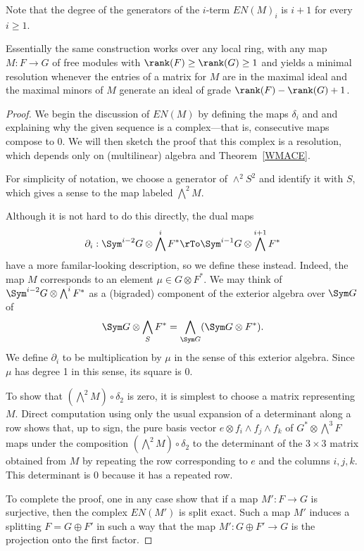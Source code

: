 Note that the degree of the generators of the $i$-term $EN(M)_i$ is $i+1$ for every $i\geq 1$.

Essentially the same construction works over any local ring, with any map $M: F\to G$ of free modules
with $\rank(F) \geq \rank(G) \geq 1$
and yields a minimal resolution whenever the entries of a matrix for $M$ are in the maximal
ideal and the maximal minors of $M$ generate an ideal of grade $\rank(F) - \rank(G)+1$.

\begin{proof} We begin the discussion of $EN(M)$ by defining the maps $\delta_i$ and and explaining why the given sequence is  a complex---that is, consecutive maps compose to 0. We will then sketch the proof that this complex is a resolution,
which depends only on (multilinear) algebra and Theorem~\ref{WMACE}. 

For simplicity of notation, we choose a generator of $\wedge^2 S^2$
 and identify it with $S$, which gives a sense to the map labeled $\bigwedge^2M$.
 
  Although it is not hard to do this directly, the dual maps
 $$
 \partial_i: \Sym^{i-2} G \otimes \bigwedge^i F^* \rTo \Sym^{i-1} G \otimes \bigwedge^{i+1} F^*
 $$
 have a more familar-looking description, so we define these instead. Indeed, the map $M$ corresponds to an
 element $\mu\in G\otimes F^*$. We may think of $ \Sym^{i-2} G \otimes \bigwedge^i  F^*$
 as a (bigraded) component of the exterior algebra over $ \Sym G$ of 
 $$
  \Sym G \otimes \bigwedge_S  F^*= \bigwedge_{ \Sym G} (\Sym G \otimes  F^*).
 $$
We define $\partial_i$ to be  multiplication by $\mu$ in the sense of this exterior algebra. Since $\mu$ has degree 1
in this sense, its square is 0. 

To show that $(\bigwedge^2 M)\circ \delta_2$ is zero, it is simplest to choose a matrix representing $M$.
Direct computation using only the usual expansion of a determinant
along a row shows that, up to sign, the
pure basis vector $e\otimes f_i\wedge f_j\wedge f_k$ of $G^*\otimes \bigwedge^3 F$
maps under the composition $(\bigwedge^2 M)\circ \delta_2$ to the determinant
of the $3\times 3$ matrix obtained from $M$ by repeating the row corresponding to $e$ and
the columns $i,j,k$. This determinant is 0 because it has a repeated row.

To complete the proof, one in any case show that 
if a map $M': F\to G$ is surjective, then the complex $EN(M')$
is split exact. Such a map $M'$ induces a splitting $F = G\oplus F'$ in such a way that the map $M': G\oplus F' \to G$ is the projection onto the first factor. 


\end{proof}
